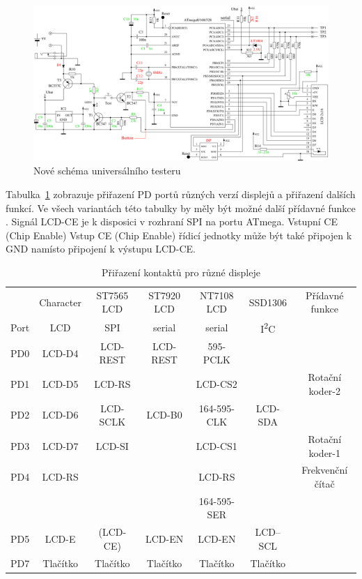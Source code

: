 \begin{figure}[H]
\centering
\includegraphics[width=1.\textwidth]{../FIG/ttester.pdf}
\caption{Nové schéma universálního testeru}
\label{fig:ttester}
\end{figure}

Tabulka~\ref{tab:displayCon} zobrazuje přiřazení PD portů různých verzí displejů
a přiřazení dalších funkcí.
Ve všech variantách této tabulky by měly být možné další přídavné funkce .
Signál LCD-CE je k disposici v rozhraní SPI na portu ATmega.  Vstupní CE (Chip Enable)
Vstup CE (Chip Enable) řídicí jednotky může být také připojen k GND namísto připojení k výstupu LCD-CE.

\begin{table}[H] \small
  \begin{center}
    \begin{tabular}{| c || c | c | c | c | c | c |}
    \hline
           & Character     & ST7565 LCD & ST7920 LCD     & NT7108 LCD  & SSD1306     & Přídavné funkce \\
      Port & LCD           &   SPI      & serial         & serial      &   I\textsuperscript{2}C      & \\
    \hline
    \hline
    PD0    &  LCD-D4       &  LCD-REST  & LCD-REST       & 595-PCLK        &            & \\
    \hline
    PD1    &  LCD-D5       &  LCD-RS    &                & LCD-CS2     &             & Rotační koder-2 \\
    \hline
    PD2    &  LCD-D6       &  LCD-SCLK  & LCD-B0         & 164-595-CLK &  LCD-SDA    & \\
    \hline
    PD3    &  LCD-D7       &  LCD-SI    &                & LCD-CS1     &             & Rotační koder-1 \\
    \hline
    PD4    &  LCD-RS       &            &                & LCD-RS      &             & Frekvenční čítač \\
           &               &            &                & 164-595-SER &             &                \\
    \hline
    PD5    &  LCD-E        &  (LCD-CE)  & LCD-EN         & LCD-EN      &   LCD--SCL  & \\
    \hline
    PD7    & Tlačítko & Tlačítko & Tlačítko & Tlačítko & Tlačítko & \\
    \hline
    \end{tabular}
  \end{center}
  \caption{Přiřazení kontaktů pro různé displeje}
  \label{tab:displayCon}
\end{table}

